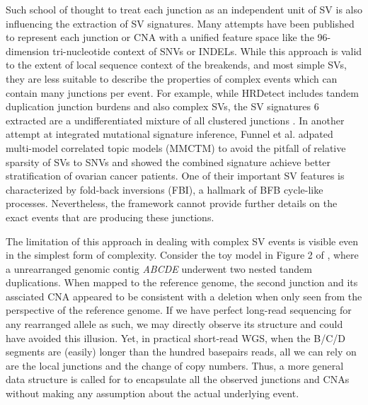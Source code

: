\documentclass[phd,tocprelim]{cornell}
\begin{document}
Such school of thought to treat each junction as an independent unit of SV is also influencing the extraction of SV signatures. Many attempts have been published to represent each junction or CNA with a unified feature space like the 96-dimension tri-nucleotide context of SNVs or INDELs. While this approach is valid to the extent of local sequence context of the breakends, and most simple SVs, they are less suitable to describe the properties of complex events which can contain many junctions per event. For example, while HRDetect includes tandem duplication junction burdens and also complex SVs, the SV signatures 6 extracted are a undifferentiated mixture of all clustered junctions \cite{Davies:2017642}. In another attempt at integrated mutational signature inference, Funnel et al. \cite{Funnell2019-ti} adpated multi-model correlated topic models (MMCTM) to avoid the pitfall of relative sparsity of SVs to SNVs and showed the combined signature achieve better stratification of ovarian cancer patients. One of their important SV features is characterized by fold-back inversions (FBI), a hallmark of BFB cycle-like processes. Nevertheless, the framework cannot provide further details on the exact events that are producing these junctions.

The limitation of this approach in dealing with complex SV events is visible even in the simplest form of complexity. Consider the toy model in Figure 2 of \cite{Maciejowski2016-nf}, where a unrearranged genomic contig \textit{ABCDE} underwent two nested tandem duplications. When mapped to the reference genome, the second junction and its assciated CNA appeared to be consistent with a deletion when only seen from the perspective of the reference genome. If we have perfect long-read sequencing for any rearranged allele as such, we may directly observe its structure and could have avoided this illusion. Yet, in practical short-read WGS, when the B/C/D segments are (easily) longer than the hundred basepairs reads, all we can rely on are the local junctions and the change of copy numbers. Thus, a more general data structure is called for to encapsulate all the observed junctions and CNAs without making any assumption about the actual underlying event.
\end{document}
